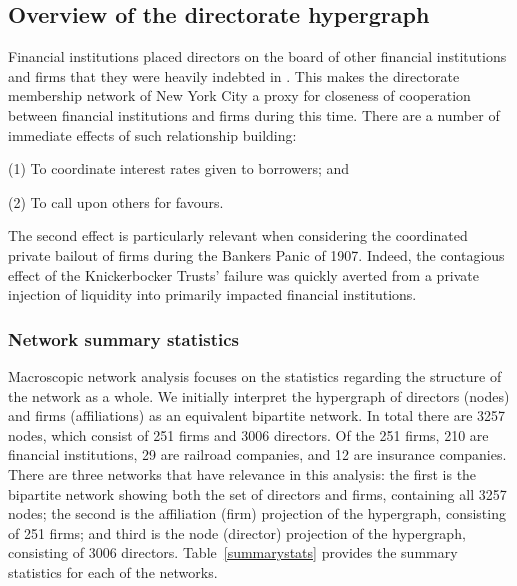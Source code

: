 \documentclass[11pt,fleqn]{article}
\newcounter{llst}
\newenvironment{abet}{\begin{list}{\rm (\alph{llst})}{\usecounter{llst}
\setlength{\itemindent}{0em} \setlength{\leftmargin}{3em}
\setlength{\labelwidth}{2em} \setlength{\labelsep}{1em}}}{\end{list}}
\begin{document}
\subsection{Overview of the directorate hypergraph}

Financial institutions placed directors on the board of other financial institutions and firms that they were heavily indebted in \citep{PujoCommittee1913}. This makes the directorate membership network of New York City a proxy for closeness of cooperation between financial institutions and firms during this time. There are a number of immediate effects of such relationship building:
\begin{abet}
	\item[(1)] To coordinate interest rates given to borrowers; and
	\item[(2)] To call upon others for favours.
\end{abet}
The second effect is particularly relevant when considering the coordinated private bailout of firms during the Bankers Panic of 1907. Indeed, the contagious effect of the Knickerbocker Trusts' failure was quickly averted from a private injection of liquidity into primarily impacted financial institutions.

\subsubsection*{Network summary statistics}

Macroscopic network analysis focuses on the statistics regarding the structure of the network as a whole. We initially interpret the hypergraph of directors (nodes) and firms (affiliations) as an equivalent bipartite network. In total there are 3257 nodes, which consist of 251 firms and 3006 directors. Of the 251 firms, 210 are financial institutions, 29 are railroad companies, and 12 are insurance companies. There are three networks that have relevance in this analysis: the first is the bipartite network showing both the set of directors and firms, containing all 3257 nodes; the second is the affiliation (firm) projection of the hypergraph, consisting of 251 firms; and third is the node (director) projection of the hypergraph, consisting of 3006 directors. Table~\ref{summarystats} provides the summary statistics for each of the networks.
\end{document}
